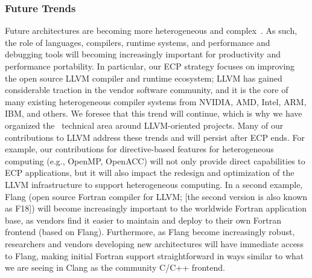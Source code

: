 \subsubsection{Future Trends}

Future architectures are becoming more heterogeneous and complex~\cite{vetter:2018:extreme}. As such, the role of languages, compilers, runtime systems, and performance and debugging tools will becoming increasingly important for productivity and performance portability. 
%
In particular, our ECP strategy focuses on improving the open source LLVM compiler and runtime ecosystem; LLVM has gained considerable traction in the vendor software community, and it is the core of many existing heterogeneous compiler systems from NVIDIA, AMD, Intel, ARM, IBM, and others.  We foresee that this trend will continue, which is why we have organized the \tools\ technical area around LLVM-oriented projects.  
%
Many of our contributions to LLVM address these trends and will persist after ECP ends. 
%
For example, our contributions for directive-based features for heterogeneous computing (e.g., OpenMP, OpenACC) will not only provide direct capabilities to ECP applications, but it will also impact the redesign and optimization of the LLVM infrastructure to support heterogeneous computing.
%
In a second example, Flang (open source Fortran compiler for LLVM; [the second version is also known as F18]) will become increasingly important to the worldwide Fortran application base, as vendors find it easier to maintain and deploy to their own Fortran frontend (based on Flang).  
%
Furthermore, as Flang become increasingly robust, researchers and vendors developing new architectures will have immediate access to Flang, making initial Fortran support straightforward in ways similar to what we are seeing in Clang as the community C/C++ frontend.

%
